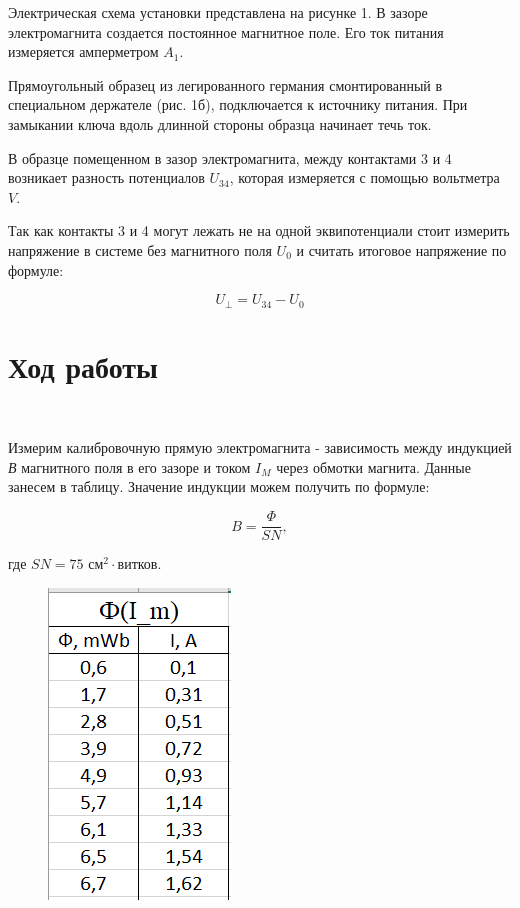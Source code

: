 \documentclass[11pt]{article}
\begin{document}
Электрическая схема установки представлена на рисунке 1. В зазоре электромагнита создается постоянное магнитное поле. Его ток питания измеряется амперметром $A_1$. 

Прямоугольный образец из легированного германия смонтированный в специальном держателе (рис. 1б), подключается к источнику питания. При замыкании ключа вдоль длинной стороны образца начинает течь ток.

В образце помещенном в зазор электромагнита, между контактами 3 и  4 возникает разность потенциалов $U_{34}$, которая измеряется с помощью вольтметра $V$.

Так как контакты 3 и 4 могут лежать не на одной эквипотенциали стоит измерить напряжение в системе без магнитного поля $U_0$ и считать итоговое напряжение по формуле:

\[U_\perp = U_{34} - U_0\]

\newpage

\section*{Ход работы}\

Измерим калибровочную прямую электромагнита - зависимость между индукцией \textit{В} магнитного поля в его зазоре и током $I_M$ через обмотки магнита. Данные занесем в таблицу. Значение индукции можем получить по формуле:

\begin{equation}
B = \frac{\Phi}{SN},
\end{equation}

где $SN = 75$ $\textit{см}^2 \cdot \textit{витков}$.

\begin{figure}[h!]
\centering
\includegraphics[scale=1]{table1.png}
\label{fig:Image1}
\end{figure}
\end{document}
